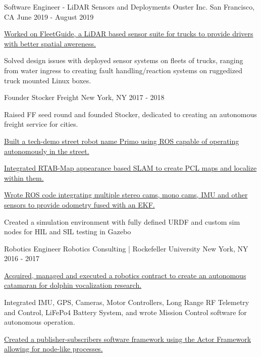 \begin{cventries}
  \cventry
    {Software Engineer - LiDAR Sensors and Deployments} %
    {Ouster Inc.} %
    {San Francisco, CA} %
    {June 2019 - August 2019} %
    {
      \begin{cvitems} %
        \item {\href{https://www.fleetguide.io/}
                {Worked on FleetGuide, a LiDAR based sensor suite for trucks to provide drivers with better spatial awereness.}}
        \item {Solved design issues with deployed sensor systems on fleets of trucks, ranging from water ingress to creating fault handling/reaction
        systems on ruggedized truck mounted Linux boxes.}
      \end{cvitems}
    }

  \cventry
    {Founder} %
    {Stocker Freight} %
    {New York, NY} %
    {2017 - 2018} %
    {
      \begin{cvitems} %
        \item {Raised FF seed round and founded Stocker, dedicated to creating an autonomous freight service for cities.}
        \item {\href{http://bit.ly/2T3Kvvs}
            {Built a tech-demo street robot name Primo using ROS capable of operating autonomously in the street.}}
        \item {\href{http://bit.ly/2TjikYy}
            {Integrated RTAB-Map appearance based SLAM to create PCL maps and localize within them.}}
        \item {\href{http://bit.ly/2T3d4sU}
            {Wrote ROS code integrating multiple stereo cams, mono cams, IMU and other sensors to provide odometry fused with an EKF.}}
        \item {Created a simulation environment with fully defined URDF and custom sim nodes for HIL and SIL testing in Gazebo}
      \end{cvitems}
    }

  \cventry
    {Robotics Engineer} %
    {Robotics Consulting | Rockefeller University} %
    {New York, NY} %
    {2016 - 2017} %
    {
      \begin{cvitems} %
        \item {\href{http://bit.ly/2Tg8zKO}
            {Acquired, managed and executed a robotics contract to create an autonomous catamaran for dolphin vocalization research.}}
        \item {Integrated IMU, GPS, Cameras, Motor Controllers, Long Range RF Telemetry and Control, 
                    LiFePo4 Battery System, and wrote Mission Control software for autonomous operation.}
        \item {\href{http://bit.ly/2BSBD1c}{Created a publisher-subscribers software framework using the Actor Framework allowing for node-like processes.}}
      \end{cvitems}
    }


\end{cventries}
